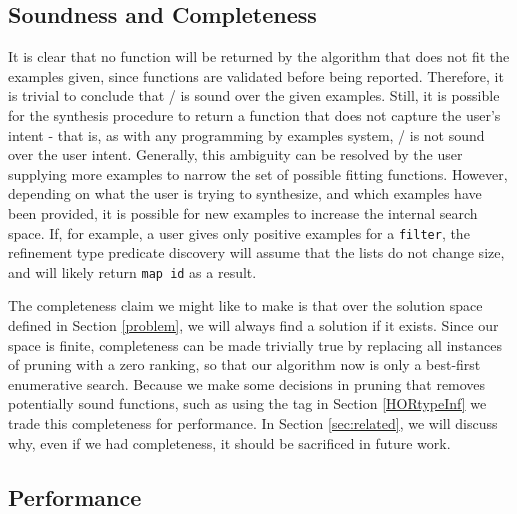 \subsection{Soundness and Completeness}\label{sound}

It is clear that no function will be returned by the algorithm that does not fit the examples given, since functions are validated before being reported. 
Therefore, it is trivial to conclude that \ourTool/ is sound over the given examples.
Still, it is possible for the synthesis procedure to return a function that does not capture the user's intent - that is, as with any programming by examples system, \ourTool/ is not sound over the user intent.
Generally, this ambiguity can be resolved by the user supplying more examples to narrow the set of possible fitting functions.
However, depending on what the user is trying to synthesize, and which examples have been provided, it is possible for new examples to increase the internal search space. 
If, for example, a user gives only positive examples for a \texttt{filter}, the refinement type predicate discovery will assume that the lists do not change size, and will likely return \texttt{map id} as a result.

The completeness claim we might like to make is that over the solution space defined in Section \ref{problem}, we will always find a solution if it exists.
Since our space is finite, completeness can be made trivially true by replacing all instances of pruning with a zero ranking, so that our algorithm now is only a best-first enumerative search.
Because we make some decisions in pruning that removes potentially sound functions, such as using the  tag in Section \ref{HORtypeInf} we trade this completeness for performance.
In Section \ref{sec:related}, we will discuss why, even if we had completeness, it should be sacrificed in future work.


\subsection{Performance}

